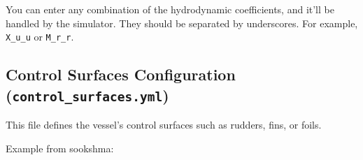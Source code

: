 \documentclass[
  letterpaper,
  DIV=11,
  numbers=noendperiod]{scrreprt}
\begin{document}
You can enter any combination of the hydrodynamic coefficients, and
it'll be handled by the simulator. They should be separated by
underscores. For example, \texttt{X\_u\_u} or \texttt{M\_r\_r}.

\subsection*{\texorpdfstring{Control Surfaces Configuration
(\texttt{control\_surfaces.yml})}{Control Surfaces Configuration (control\_surfaces.yml)}}\label{control-surfaces-configuration-control_surfaces.yml}

This file defines the vessel's control surfaces such as rudders, fins,
or foils.

Example from sookshma:
\end{document}
